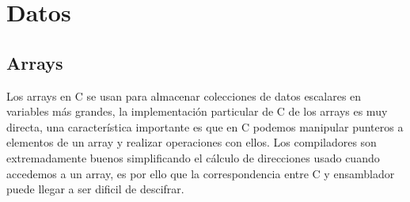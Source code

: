 \section{Datos}
\subsection{Arrays}
Los arrays en C se usan para almacenar colecciones de datos escalares en variables más grandes, la implementación particular
de C de los arrays es muy directa, una característica importante es que en C podemos manipular punteros a elementos de un array
y realizar operaciones con ellos. Los compiladores son extremadamente buenos simplificando el cálculo de direcciones 
usado cuando accedemos a un array, es por ello que la correspondencia entre C y ensamblador puede llegar a ser dificil de descifrar.
